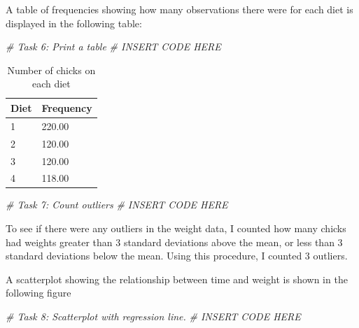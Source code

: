 \documentclass[english,man]{apa6}
\newenvironment{Shaded}{\begin{snugshade}}{\end{snugshade}}
\newcommand{\CommentTok}[1]{\textcolor[rgb]{0.56,0.35,0.01}{\textit{{#1}}}}
\begin{document}
A table of frequencies showing how many observations there were for each
diet is displayed in the following table:

\begin{Shaded}
\begin{Highlighting}[]
\CommentTok{# Task 6: Print a table}
\CommentTok{# INSERT CODE HERE}
\end{Highlighting}
\end{Shaded}

\begin{table}[tbp]
\begin{center}
\begin{threeparttable}
\caption{\label{tab:unnamed-chunk-12}Number of chicks on each diet}
\begin{tabular}{ll}
\toprule
Diet & \multicolumn{1}{c}{Frequency}\\
\midrule
1 & 220.00\\
2 & 120.00\\
3 & 120.00\\
4 & 118.00\\
\bottomrule
\end{tabular}
\end{threeparttable}
\end{center}
\end{table}

\begin{Shaded}
\begin{Highlighting}[]
\CommentTok{# Task 7: Count outliers}
\CommentTok{# INSERT CODE HERE}
\end{Highlighting}
\end{Shaded}

To see if there were any outliers in the weight data, I counted how many
chicks had weights greater than 3 standard deviations above the mean, or
less than 3 standard deviations below the mean. Using this procedure, I
counted 3 outliers.

A scatterplot showing the relationship between time and weight is shown
in the following figure

\begin{Shaded}
\begin{Highlighting}[]
\CommentTok{# Task 8: Scatterplot with regression line.}
\CommentTok{# INSERT CODE HERE}
\end{Highlighting}
\end{Shaded}
\end{document}

